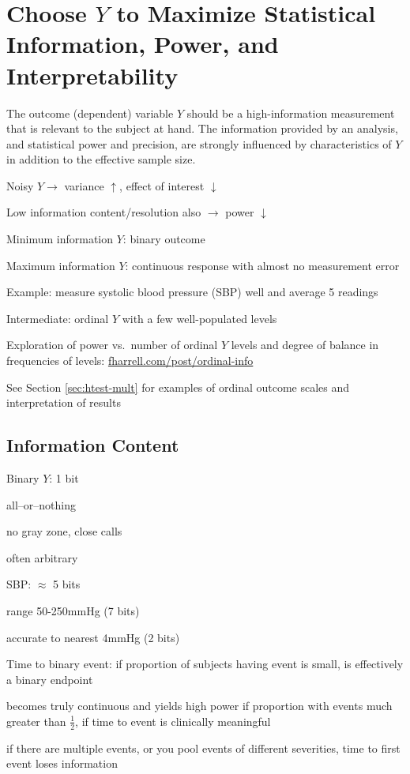\section{Choose $Y$ to Maximize Statistical Information, Power, and Interpretability}\label{sec:overview-ychoice}
The outcome (dependent) variable $Y$ should be a high-information 
measurement that is relevant to the subject at hand.  The information
provided by an analysis, and statistical power and precision, are
strongly influenced by characteristics of $Y$ in addition to the
effective sample size.
  \bi
  \item Noisy $Y \rightarrow$ variance $\uparrow$, effect of
    interest $\downarrow$
  \item Low information content/resolution also $\rightarrow$ power
    $\downarrow$ 
  \item Minimum information $Y$: binary outcome
  \item Maximum information $Y$: continuous response with almost no
    measurement error
    \bi
    \item Example: measure systolic blood pressure (SBP) well and
      average 5 readings 
    \ei
  \item Intermediate: ordinal $Y$ with a few well-populated levels
  \item Exploration of power vs.\ number of ordinal $Y$ levels and
    degree of balance in frequencies of levels: \href{https://fharrell.com/post/ordinal-info}{fharrell.com/post/ordinal-info}
  \item See Section \ref{sec:htest-mult} for examples of ordinal outcome scales and interpretation of results
  \ei

\subsection{Information Content}\label{sec:overview-info-content}
  \bi
  \item Binary $Y$: 1 bit
    \bi
    \item all--or--nothing
    \item no gray zone, close calls
    \item often arbitrary
    \ei
  \item SBP: $\approx$ 5 bits
    \bi
    \item range 50-250mmHg (7 bits)
    \item accurate to nearest 4mmHg (2 bits)
    \ei
  \item Time to binary event: if proportion of subjects having event is
    small, is effectively a binary endpoint
    \bi
    \item becomes truly continuous and yields high power if proportion
      with events much greater than $\frac{1}{2}$, if time to event is
      clinically meaningful
    \item if there are multiple events, or you pool events of
      different severities, time to first event loses information
    \ei
  \ei
  
